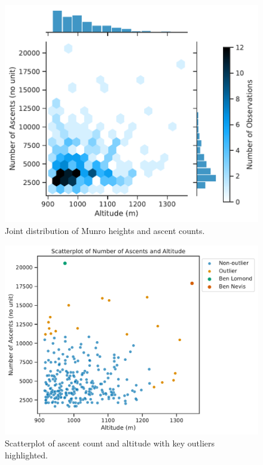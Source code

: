 \documentclass[11pt,a4paper]{article}
\begin{document}
\begin{figure} [h!]
  \centering
  \includegraphics{report/heatmap_joint_distribution.pdf}
  \caption{Joint distribution of Munro heights and ascent counts.}
  \label{fds-project-template:fig:heatmap}
\end{figure}

\medskip 

\begin{figure} [h!]
  \centering
  \includegraphics{report/scatterplot.pdf}
  \caption{Scatterplot of ascent count and altitude with key outliers highlighted.}
  \label{fds-project-template:fig:scatterplot}
\end{figure}
\end{document}
